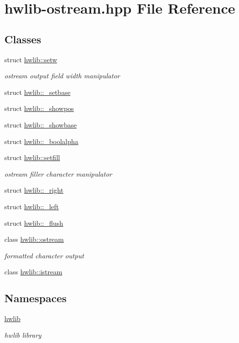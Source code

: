 \hypertarget{hwlib-ostream_8hpp}{}\section{hwlib-\/ostream.hpp File Reference}
\label{hwlib-ostream_8hpp}
\subsection*{Classes}
\begin{DoxyCompactItemize}
\item 
struct \hyperlink{structhwlib_1_1setw}{hwlib\+::setw}
\begin{DoxyCompactList}\small\item\em ostream output field width manipulator \end{DoxyCompactList}\item 
struct \hyperlink{structhwlib_1_1__setbase}{hwlib\+::\+\_\+setbase}
\item 
struct \hyperlink{structhwlib_1_1__showpos}{hwlib\+::\+\_\+showpos}
\item 
struct \hyperlink{structhwlib_1_1__showbase}{hwlib\+::\+\_\+showbase}
\item 
struct \hyperlink{structhwlib_1_1__boolalpha}{hwlib\+::\+\_\+boolalpha}
\item 
struct \hyperlink{structhwlib_1_1setfill}{hwlib\+::setfill}
\begin{DoxyCompactList}\small\item\em ostream filler character manipulator \end{DoxyCompactList}\item 
struct \hyperlink{structhwlib_1_1__right}{hwlib\+::\+\_\+right}
\item 
struct \hyperlink{structhwlib_1_1__left}{hwlib\+::\+\_\+left}
\item 
struct \hyperlink{structhwlib_1_1__flush}{hwlib\+::\+\_\+flush}
\item 
class \hyperlink{classhwlib_1_1ostream}{hwlib\+::ostream}
\begin{DoxyCompactList}\small\item\em formatted character output \end{DoxyCompactList}\item 
class \hyperlink{classhwlib_1_1istream}{hwlib\+::istream}
\end{DoxyCompactItemize}
\subsection*{Namespaces}
\begin{DoxyCompactItemize}
\item 
 \hyperlink{namespacehwlib}{hwlib}
\begin{DoxyCompactList}\small\item\em hwlib library \end{DoxyCompactList}\end{DoxyCompactItemize}
